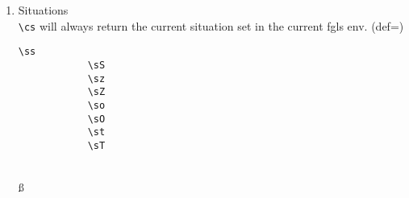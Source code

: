 \documentclass[10pt, a4paper]{article}
\begin{document}
\begin{enumerate}
\begin{center}
\begin{minipage}[h][8cm][t]{15em}
\begin{fgls}
					\bi\\
					\bI\\
					\bs\\
					\bS\\
					\br\\
					\bR\\
					\bp\\
					\bP\\
					\bq\\
					\bQ\\
					\be\\
					\bE
				\end{fgls}
			\end{minipage}
		\end{center}
		\item Situations
		\\\verb=\cs= will always return the current situation set in the current fgls env. (def=\sstar)
		\begin{center}
			\begin{minipage}[h][3.5cm][t]{15em}
				\begin{lstlisting}[style=B]
			\ss
			\sS
			\sz
			\sZ
			\so
			\sO
			\st
			\sT
				\end{lstlisting}
			\end{minipage}
			\begin{minipage}[h][3.5cm][t]{15em}
				\begin{fgls}
					\ \\
					\ss\\
					\sS\\
					\sz\\
					\sZ\\
					\so\\
					\sO\\
					\st\\
					\sT
				\end{fgls}
			\end{minipage}
		\end{center}
	\end{enumerate}
\end{document}
